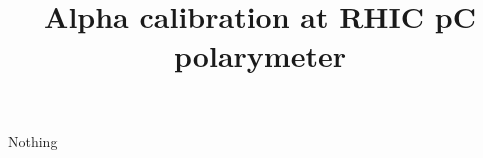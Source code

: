 \documentclass[a4paper]{article}
\title{Alpha calibration at RHIC pC polarymeter}
\begin{document}
Nothing
\end{document}
